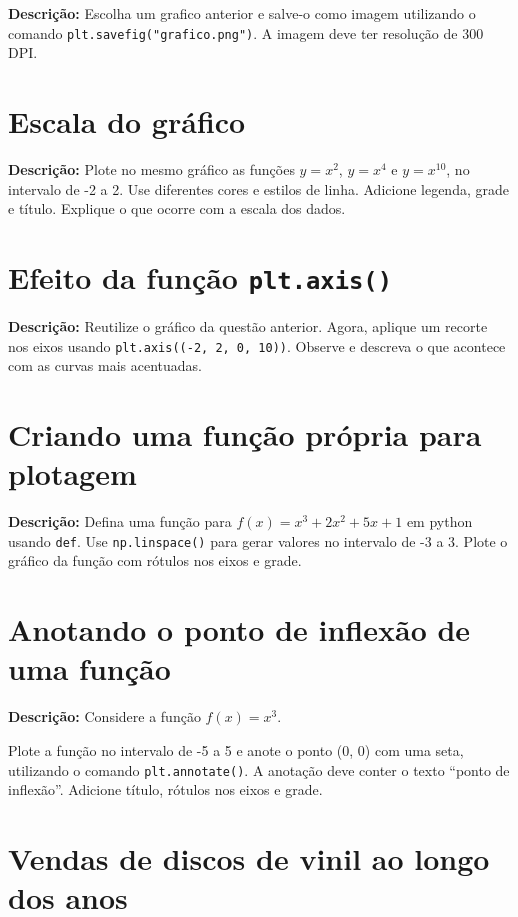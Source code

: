\textbf{Descrição:}  
Escolha um grafico anterior e salve-o como imagem utilizando o comando \texttt{plt.savefig("grafico.png")}.  
A imagem deve ter resolução de 300 DPI. 

\section{Escala do gráfico}

\textbf{Descrição:}  
Plote no mesmo gráfico as funções \( y = x^2 \), \( y = x^4 \) e \( y = x^{10} \), no intervalo de -2 a 2.  
Use diferentes cores e estilos de linha.  
Adicione legenda, grade e título.  
Explique o que ocorre com a escala dos dados.

\section{Efeito da função \texttt{plt.axis()}}

\textbf{Descrição:}  
Reutilize o gráfico da questão anterior.  
Agora, aplique um recorte nos eixos usando \texttt{plt.axis((-2, 2, 0, 10))}.  
Observe e descreva o que acontece com as curvas mais acentuadas.

\section{Criando uma função própria para plotagem}

\textbf{Descrição:}  
Defina uma função para \( f(x) = x^3 + 2x^2 + 5x + 1 \) em python usando \texttt{def}.  
Use \texttt{np.linspace()} para gerar valores no intervalo de -3 a 3. 
Plote o gráfico da função com rótulos nos eixos e grade.

\section{Anotando o ponto de inflexão de uma função}

\textbf{Descrição:}  
Considere a função \( f(x) = x^3 \).  

Plote a função no intervalo de -5 a 5 e anote o ponto (0, 0) com uma seta, utilizando o comando \texttt{plt.annotate()}.  
A anotação deve conter o texto “ponto de inflexão”.  
Adicione título, rótulos nos eixos e grade.



\section{Vendas de discos de vinil ao longo dos anos}

